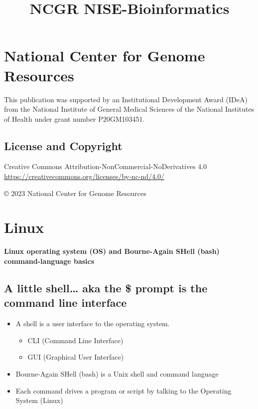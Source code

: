 \documentclass[
]{book}
\title{NCGR NISE-Bioinformatics}
\author{}
\date{\vspace{-2.5em}}
\providecommand{\tightlist}{%
  \setlength{\itemsep}{0pt}\setlength{\parskip}{0pt}}
\begin{document}
\maketitle

{
\setcounter{tocdepth}{1}
\tableofcontents
}
\hypertarget{national-center-for-genome-resources}{%
\chapter*{National Center for Genome Resources}\label{national-center-for-genome-resources}}

This publication was supported by an Institutional Development Award (IDeA) from the National Institute of General Medical Sciences of the National Institutes of Health under grant number P20GM103451.

\hypertarget{license-and-copyright}{%
\section*{License and Copyright}\label{license-and-copyright}}

Creative Commons Attribution-NonCommercial-NoDerivatives 4.0
\url{https://creativecommons.org/licenses/by-nc-nd/4.0/}

© 2023 National Center for Genome Resources

\hypertarget{linux}{%
\chapter{Linux}\label{linux}}

\textbf{Linux operating system (OS) and Bourne-Again SHell (bash) command-language basics}

\hypertarget{a-little-shell-aka-the-prompt-is-the-command-line-interface}{%
\section{A little shell\ldots{} aka the \$ prompt is the command line interface}\label{a-little-shell-aka-the-prompt-is-the-command-line-interface}}

\begin{itemize}
\tightlist
\item
  A shell is a user interface to the operating system.

  \begin{itemize}
  \tightlist
  \item
    CLI (Command Line Interface)
  \item
    GUI (Graphical User Interface)
  \end{itemize}
\item
  Bourne-Again SHell (bash) is a Unix shell and command language
\item
  Each command drives a program or script by talking to the Operating System
  (Linux)
\end{itemize}
\end{document}
